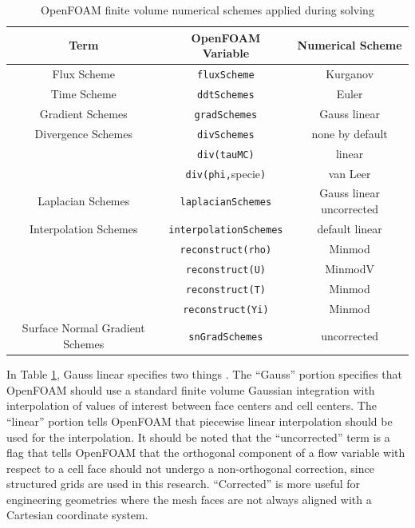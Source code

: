\begin{table}[t!]
\centering
\caption{OpenFOAM finite volume numerical schemes applied during solving}
\label{tab:numschemes}
\begin{tabular}{ccc}
Term & OpenFOAM Variable & Numerical Scheme \\ \hline 
Flux Scheme & \verb|fluxScheme| & Kurganov \\ 
Time Scheme & \verb|ddtSchemes| & Euler \\
Gradient Schemes & \verb|gradSchemes| & Gauss linear \\ 
Divergence Schemes & \verb|divSchemes| & none by default \\ 
& \verb|div(tauMC)| & linear \\ 
& \verb|div(phi,|specie\verb|)| & van Leer \\ 
Laplacian Schemes & \verb|laplacianSchemes| & Gauss linear uncorrected \\ 
Interpolation Schemes & \verb|interpolationSchemes| & default linear \\
& \verb|reconstruct(rho)| & Minmod \\ 
& \verb|reconstruct(U)| & MinmodV \\ 
& \verb|reconstruct(T)| & Minmod \\ 
& \verb|reconstruct(Yi)| & Minmod \\ 
Surface Normal Gradient Schemes & \verb|snGradSchemes| & uncorrected \\
\end{tabular}
\end{table}

In Table \ref{tab:numschemes}, Gauss linear specifies two things \cite{ofug}. The ``Gauss'' portion specifies that OpenFOAM should use a standard finite volume Gaussian integration with interpolation of values of interest between face centers and cell centers. The ``linear'' portion tells OpenFOAM that piecewise linear interpolation should be used for the interpolation. It should be noted that the ``uncorrected'' term is a flag that tells OpenFOAM that the orthogonal component of a flow variable with respect to a cell face should not undergo a non-orthogonal correction, since structured grids are used in this research. ``Corrected'' is more useful for engineering geometries where the mesh faces are not always aligned with a Cartesian coordinate system. 

